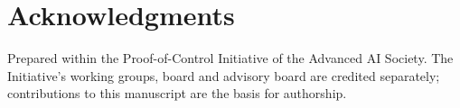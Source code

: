 \documentclass[11pt]{article}
\begin{document}
\section*{Acknowledgments}

Prepared within the Proof-of-Control Initiative of the Advanced AI Society.
The Initiative's working groups, board and advisory board are credited
separately; contributions to this manuscript are the basis for authorship.



\end{document}
